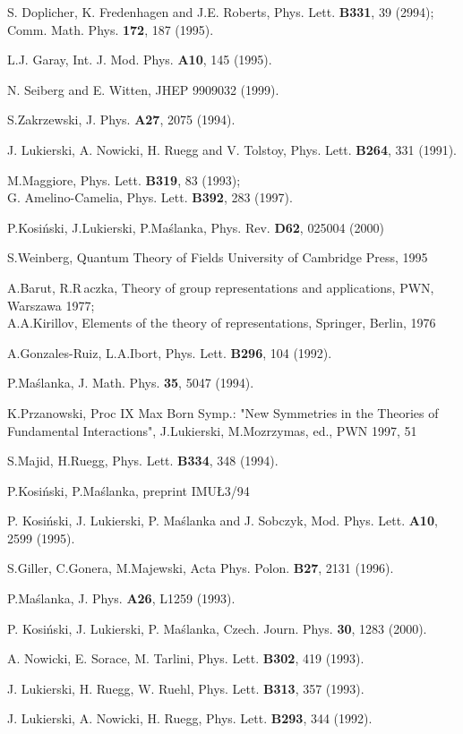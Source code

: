 \documentclass[a4paper,a4paper]{article}
\begin{document}
\begin{thebibliography}{99}
 S. Doplicher, K. Fredenhagen and J.E. Roberts, Phys.
Lett. {\bf B331}, 39 (2994); Comm. Math. Phys. {\bf 172}, 187
(1995).

 L.J. Garay, Int. J. Mod. Phys. {\bf A10}, 145 (1995).

 N. Seiberg and E. Witten, JHEP 9909032 (1999).

 S.Zakrzewski, J. Phys. {\bf A27}, 2075 (1994).

J. Lukierski, A. Nowicki, H. Ruegg and V. Tolstoy, Phys. Lett.
{\bf B264}, 331 (1991).


 M.Maggiore, Phys. Lett. {\bf B319}, 83 (1993);
\\    G. Amelino-Camelia, Phys. Lett.  {\bf B392}, 283 (1997).

P.Kosi\'nski, J.Lukierski, P.Ma\'slanka, Phys. Rev.
{\bf D62}, 025004 (2000)

S.Weinberg, Quantum Theory of Fields University of Cambridge Press, 1995

A.Barut, R.R\,aczka, Theory of group representations
 and applications, PWN, Warszawa 1977;\\
A.A.Kirillov, Elements of the theory of representations,
 Springer, Berlin, 1976

A.Gonzales-Ruiz, L.A.Ibort, Phys. Lett. {\bf B296}, 104 (1992).

P.Ma\'slanka, J. Math. Phys. {\bf 35}, 5047 (1994).

K.Przanowski, Proc IX Max Born Symp.: "New Symmetries in the Theories of Fundamental
 Interactions", J.Lukierski, M.Mozrzymas, ed., PWN 1997, 51

S.Majid, H.Ruegg, Phys. Lett. {\bf B334}, 348 (1994).


P.Kosi\'nski, P.Ma\'slanka, preprint IMU\L  3/94

 P. Kosi\'{n}ski, J. Lukierski, P. Ma\'{s}lanka and
J. Sobczyk, Mod. Phys. Lett. {\bf A10}, 2599 (1995).


S.Giller, C.Gonera, M.Majewski, Acta Phys. Polon. {\bf B27}, 2131
(1996).

P.Ma\'slanka, J. Phys. {\bf A26}, L1259 (1993).

 P. Kosi\'{n}ski, J. Lukierski, P. Ma\'{s}lanka,
Czech. Journ. Phys. {\bf 30}, 1283 (2000).

 A. Nowicki, E. Sorace, M. Tarlini, Phys. Lett.
 {\bf B302}, 419 (1993).



 J. Lukierski, H. Ruegg, W. Ruehl, Phys. Lett. {\bf
B313}, 357 (1993).

 J. Lukierski, A. Nowicki, H. Ruegg, Phys. Lett.
{\bf B293}, 344 (1992).

\end{thebibliography}
\end{document}
